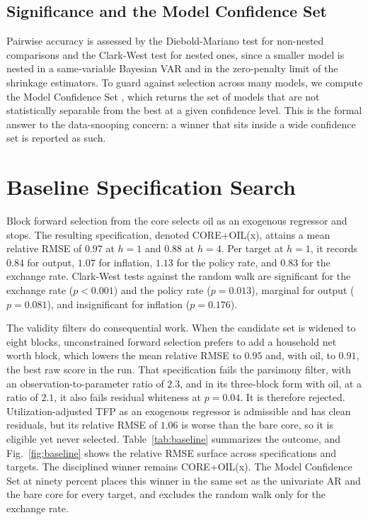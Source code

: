 \documentclass[conference]{IEEEtran}
\begin{document}
\subsection{Significance and the Model Confidence Set}
Pairwise accuracy is assessed by the Diebold-Mariano test \cite{dm1995} for non-nested comparisons and the Clark-West test \cite{cw2007} for nested ones, since a smaller model is nested in a same-variable Bayesian VAR and in the zero-penalty limit of the shrinkage estimators. To guard against selection across many models, we compute the Model Confidence Set \cite{hln2011}, which returns the set of models that are not statistically separable from the best at a given confidence level. This is the formal answer to the data-snooping concern: a winner that sits inside a wide confidence set is reported as such.

\section{Baseline Specification Search}
Block forward selection from the core selects oil as an exogenous regressor and stops. The resulting specification, denoted CORE+OIL(x), attains a mean relative RMSE of $0.97$ at $h=1$ and $0.88$ at $h=4$. Per target at $h=1$, it records $0.84$ for output, $1.07$ for inflation, $1.13$ for the policy rate, and $0.83$ for the exchange rate. Clark-West tests against the random walk are significant for the exchange rate ($p<0.001$) and the policy rate ($p=0.013$), marginal for output ($p=0.081$), and insignificant for inflation ($p=0.176$).

The validity filters do consequential work. When the candidate set is widened to eight blocks, unconstrained forward selection prefers to add a household net worth block, which lowers the mean relative RMSE to $0.95$ and, with oil, to $0.91$, the best raw score in the run. That specification fails the parsimony filter, with an observation-to-parameter ratio of $2.3$, and in its three-block form with oil, at a ratio of $2.1$, it also fails residual whiteness at $p=0.04$. It is therefore rejected. Utilization-adjusted TFP as an exogenous regressor is admissible and has clean residuals, but its relative RMSE of $1.06$ is worse than the bare core, so it is eligible yet never selected. Table~\ref{tab:baseline} summarizes the outcome, and Fig.~\ref{fig:baseline} shows the relative RMSE surface across specifications and targets. The disciplined winner remains CORE+OIL(x). The Model Confidence Set at ninety percent places this winner in the same set as the univariate AR and the bare core for every target, and excludes the random walk only for the exchange rate.
\end{document}
